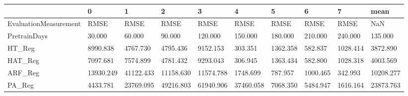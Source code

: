 \begin{tabular}{llllllllll}
\toprule
{} &         0 &         1 &         2 &         3 &         4 &        5 &        6 &        7 &      mean \\
\midrule
EvaluationMeasurement &      RMSE &      RMSE &      RMSE &      RMSE &      RMSE &     RMSE &     RMSE &     RMSE &       NaN \\
PretrainDays          &    30.000 &    60.000 &    90.000 &   120.000 &   150.000 &  180.000 &  210.000 &  240.000 &   135.000 \\
HT\_Reg                &  8990.838 &  4767.730 &  4795.436 &  9152.153 &   303.351 & 1362.358 &  582.837 & 1028.414 &  3872.890 \\
HAT\_Reg               &  7097.681 &  7574.899 &  4781.432 &  9293.043 &   306.945 & 1363.434 &  582.800 & 1028.318 &  4003.569 \\
ARF\_Reg               & 13930.249 & 41122.433 & 11158.630 & 11574.788 &  1748.699 &  787.957 & 1000.465 &  342.993 & 10208.277 \\
PA\_Reg                &  4433.781 & 23769.095 & 49216.803 & 61940.906 & 37460.058 & 7068.350 & 5484.947 & 1616.164 & 23873.763 \\
\bottomrule
\end{tabular}
